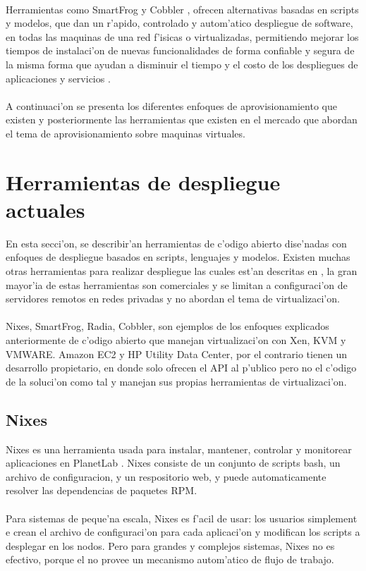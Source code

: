 \\
Herramientas como SmartFrog \cite{3} y Cobbler \cite{6} , ofrecen alternativas basadas en scripts y modelos, que dan un r'apido, controlado y autom'atico despliegue de software, en todas las maquinas de una red f'isicas o virtualizadas, permitiendo mejorar los tiempos de instalaci'on de nuevas funcionalidades de forma confiable y segura de la misma forma que ayudan a disminuir el tiempo y el costo de los despliegues de aplicaciones y servicios \cite{4}.\\
\\
A continuaci'on se presenta los diferentes enfoques de aprovisionamiento que existen y posteriormente las herramientas que existen en el mercado que abordan el tema de aprovisionamiento sobre maquinas virtuales.

\section{Herramientas de despliegue actuales}
En esta secci'on, se describir'an herramientas de c'odigo abierto dise'nadas con enfoques de despliegue basados en scripts, lenguajes y modelos. Existen muchas otras herramientas para realizar despliegue las cuales est'an descritas en \cite{12}, la gran mayor'ia de estas herramientas son comerciales y se limitan a configuraci'on de servidores remotos en redes privadas y no abordan el tema de virtualizaci'on.\\
\\
Nixes, SmartFrog, Radia, Cobbler, son ejemplos de los enfoques explicados anteriormente de c'odigo abierto que manejan virtualizaci'on con Xen, KVM y VMWARE. Amazon EC2 y HP Utility Data Center, por el contrario tienen un desarrollo propietario, en donde solo ofrecen el API al p'ublico pero no el c'odigo de la soluci'on como tal y manejan sus propias herramientas de virtualizaci'on.

\subsection{Nixes}
Nixes es una herramienta usada para instalar, mantener, controlar y monitorear aplicaciones en PlanetLab \cite{1}. Nixes consiste de un conjunto de scripts bash, un archivo de configuracion, y un respositorio web, y puede automaticamente resolver las dependencias de paquetes RPM.\\
\\
Para sistemas de peque'na escala, Nixes es f'acil de usar: los usuarios simplement e crean el archivo de configuraci'on para cada aplicaci'on y modifican los scripts a desplegar en los nodos. Pero para grandes y complejos sistemas, Nixes no es efectivo, porque el no provee un mecanismo autom'atico de flujo de trabajo.

